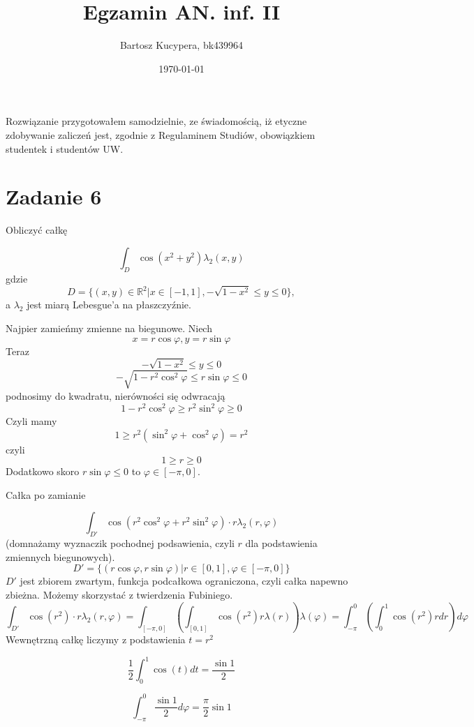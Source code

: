 \documentclass{article}
\title{Egzamin AN. inf. II}
\author{Bartosz Kucypera, bk439964}
\date{\today}
\begin{document}
\maketitle

Rozwiązanie przygotowałem samodzielnie, ze świadomością, iż etyczne zdobywanie zaliczeń jest, zgodnie z Regulaminem Studiów, obowiązkiem studentek i studentów UW.

\section*{Zadanie 6}
Obliczyć całkę

$$ \int_D \cos(x^2+y^2)\lambda_2(x, y)$$
gdzie 
$$ D =\{(x,y)\in \mathbb{R}^2 | x \in[-1, 1], -\sqrt{1-x^2} \le y \le 0\}, $$
a $\lambda_2$ jest miarą Lebesgue'a na płaszczyźnie.

Najpier zamieńmy zmienne na biegunowe. Niech 
$$ x = r\cos\varphi, y = r\sin\varphi$$
Teraz
$$ -\sqrt{1-x^2} \le y \le 0$$ 
$$ -\sqrt{1-r^2\cos^2\varphi} \le  r\sin\varphi \le 0$$
podnosimy do kwadratu, nierówności się odwracają
$$ 1 -r^2\cos^2\varphi \ge r^2\sin^2\varphi \ge 0 $$
Czyli mamy 
$$ 1 \ge r^2(\sin^2\varphi + \cos^2\varphi) = r^2 $$
czyli
$$ 1 \ge r \ge 0 $$
Dodatkowo skoro $r\sin\varphi \le 0$ to $\varphi \in [-\pi, 0]$. \newline

Całka po zamianie

$$ \int_{D'}\cos(r^2\cos^2\varphi + r^2\sin^2\varphi) \cdot r \lambda_2(r, \varphi) $$
(domnażamy wyznaczik pochodnej podsawienia, czyli $r$ dla podstawienia zmiennych biegunowych).
$$D' = \{(r\cos\varphi, r\sin\varphi) | r \in [0, 1], \varphi \in [-\pi, 0]\}$$
$D'$ jest zbiorem zwartym, funkcja podcałkowa ograniczona, czyli całka napewno zbieżna. Możemy skorzystać z twierdzenia Fubiniego.
$$ \int_{D'}\cos(r^2) \cdot r \lambda_2(r, \varphi) = 
\int_{[-\pi, 0]} \left( \int_{[0, 1]}\cos(r^2)r\lambda(r) \right)\lambda(\varphi) = 
\int_{-\pi}^0 \left(\int_0^1\cos(r^2)r dr\right)d\varphi
$$ 
Wewnętrzną całkę liczymy z podstawienia $t = r^2$

$$ \frac{1}{2}\int_0^1\cos(t)dt = \frac{\sin1}{2}$$

$$ \int_{-\pi}^0\frac{\sin1}{2}d\varphi = \frac{\pi}{2}\sin1 $$
\end{document}
